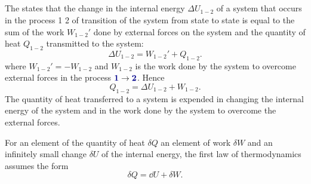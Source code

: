 \subsection{}\label{9.3.1} The  states that the change in the internal energy $\Delta U_{1-2}$ of a system that occurs in the process 1 2 of transition of the system from state  to state  is equal to the sum of the work $W_{1-2}'$ done by external forces on the system and the quantity of heat $Q_{1-2}$ transmitted to the system:
\begin{equation*}%
\Delta U_{1-2} = W_{1-2}' + Q_{1-2}.
\end{equation*}
where $W_{1-2}' = -  W_{1-2}$ and $W_{1-2}$ is the work done by the system to overcome external forces in the process $\hlblue{1} \to \hlblue{2}$. Hence
\begin{equation*}%
 Q_{1-2} = \Delta U_{1-2} + W_{1-2}.
\end{equation*}
The quantity of heat transferred to a system is expended in changing the internal energy of the system and in the work done by the system to overcome the external forces.

For an element of the quantity of heat $\delta Q$ an element of work $\delta W$ and an infinitely small change $\delta U$ of the internal energy, the first law of thermodynamics assumes the form
\begin{equation*}%
\delta Q = \dd U+ \delta W.
\end{equation*}

